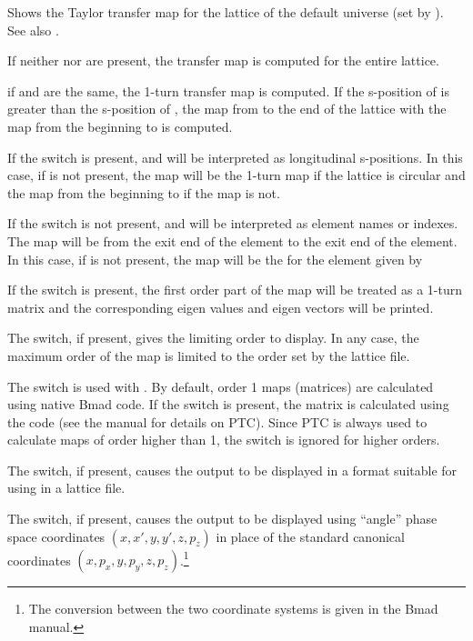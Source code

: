 {{{{{{{{{Shows the Taylor transfer map for the  lattice of the default universe (set by
).  See also .

If neither  nor  are present, the transfer map is computed for the
entire lattice.

if  and  are the same, the 1-turn transfer map is computed. If the
s-position of  is greater than the s-position of , the map from
 to the end of the lattice with the map from the beginning to  is
computed.

If the  switch is present,  and  will be interpreted as
longitudinal s-positions. In this case, if  is not present, the map will be the
1-turn map if the lattice is circular and the map from the beginning to  if the
map is not.

If the  switch is not present,  and  will be interpreted as
element names or indexes. The map will be from the exit end of the  element to
the exit end of the  element. In this case, if  is not present, the map
will be the for the element given by 

If the  switch is present, the first order part of the map will be treated
as a 1-turn matrix and the corresponding eigen values and eigen vectors will be printed.

The  switch, if present, gives the limiting order to display. In any case, the
maximum order of the map is limited to the order set by the lattice file.

The  switch is used with . By default, order 1 maps (matrices) are calculated
using native Bmad code. If the  switch is present, the matrix is calculated using the
 code (see the \bmad manual for details on PTC). Since PTC is always used to calculate maps
of order higher than 1, the  switch is ignored for higher orders.

The  switch, if present, causes the output to be displayed in a format suitable
for using in a \bmad lattice file.

The  switch, if present, causes the output to be displayed using ``angle''
phase space coordinates $(x, x', y, y', z, p_z)$ in place of the standard \bmad canonical
coordinates $(x, p_x, y, p_y, z, p_z)$.\footnote
  {
The conversion between the two coordinate systems is given in the Bmad manual.
  }

}}}}}}}}}
